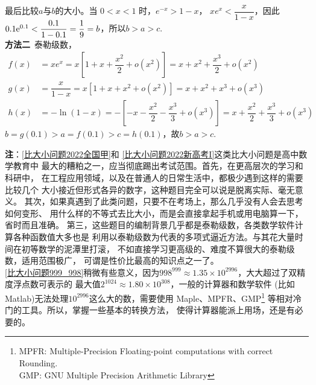 \begin{enumerate}[label={【\textbf{例\thechapter.\arabic*}】},
 leftmargin=\inteval{\myenumleftmargin}pt,
 itemsep=\inteval{\myenumitempsep}pt,
 itemindent=\inteval{\myenumitemindent}pt]
最后比较$a$与$b$的大小。当 $0<x<1$ 时，$e^{-x} > 1-x$，
$x e^{x}<\dfrac{x}{1-x} $，因此$ 0.1 \mathrm{e}^{0.1}<
\dfrac{0.1}{1-0.1}=\dfrac{1}{9}=b $，所以$b>a>c$. \\
\textbf{方法二}\ 泰勒级数，
\begin{align*}
    f(x) &=xe^{x}=x\left[1+x+\dfrac{x^{2}}{2}+o\left(x^{2}\right)\right]
    =x+x^{2}+\dfrac{x^{3}}{2}+o\left(x^{2}\right)\\
    g(x) &=\dfrac{x}{1-x}=x\left[1+x+x^{2}+o\left(x^{2}\right)\right]
    =x+x^2+x^3+o\left(x^{3}\right) \\
    h(x) &=-\ln(1-x)=-\left[-x-\dfrac{x^{2}}{2}-\dfrac{x^3}{3}+o\left(x^{3}\right)
    \right]=x+\dfrac{x^{2}}{2}+\dfrac{x^3}{3}+o\left(x^{3}\right)
\end{align*}
$b=g(0.1)>a=f(0.1)>c=h(0.1)$，故$b>a>c$. 

\textbf{注}：\ref{比大小问题2022全国甲}和
\ref{比大小问题2022新高考I}这类比大小问题是高中数学教育中
最大的糟粕之一，应当彻底踢出考试范围。首先，在更高层次的学习和科研中，
在工程应用领域，以及在普通人的日常生活中，都极少遇到这样的需要比较几个
大小接近但形式各异的数字，这种题目完全可以说是脱离实际、毫无意义。
其次，如果真遇到了此类问题，只要不在考场上，那么几乎没有人会去思考如何变形、
用什么样的不等式去比大小，而是会直接拿起手机或用电脑算一下，省时而且准确。
第三，这些题目的编制背景几乎都是泰勒级数，各类数学软件计算各种函数值大多也是
利用以泰勒级数为代表的多项式逼近方法。与其花大量时间在初等数学的泥潭里打滚，
不如直接学习更高级的、难度不算很大的泰勒级数，适用范围极广，
可谓是性价比最高的知识点之一了。 \\
\ref{比大小问题999_998}稍微有些意义，因为$ 998^{999}\approx
1.35\times 10^{2996} $，大大超过了双精度浮点数可表示的
最大值$ 2^{1024}\approx 1.80\times10^{308} $，一般的计算器和数学软件
(比如Matlab)无法处理$ 10^{2996} $这么大的数，需要使用
Maple、MPFR、GMP\footnote{MPFR: Multiple-Precision Floating-point computations with correct Rounding. \\
GMP: GNU Multiple Precision Arithmetic Library}
等相对冷门的工具。所以，掌握一些基本的转换方法，
使得计算器能派上用场，还是有必要的。


\end{enumerate}
